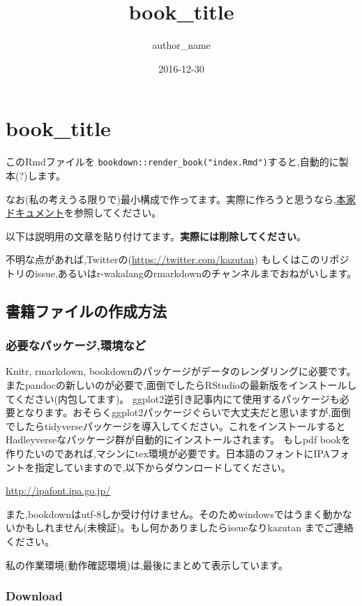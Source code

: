 \documentclass[]{book}
\title{book\_title}
\author{author\_name}
\date{2016-12-30}
\begin{document}
\maketitle

{
\setcounter{tocdepth}{1}
\tableofcontents
}
\chapter{book\_title}\label{book_title}

このRmdファイルを
\texttt{bookdown::render\_book("index.Rmd")}すると,自動的に製本(?)します。

なお(私の考えうる限りで)最小構成で作ってます。実際に作ろうと思うなら,\href{https://bookdown.org/yihui/bookdown/}{本家ドキュメント}を参照してください。

以下は説明用の文章を貼り付けてます。\textbf{実際には削除してください}。

不明な点があれば,Twitterの\citep{kazutan}(\url{https://twitter.com/kazutan})
もしくはこのリポジトリのissue,あるいはr-wakalangのrmarkdownのチャンネルまでおねがいします。

\section{書籍ファイルの作成方法}

\subsection{必要なパッケージ,環境など}

Knitr, rmarkdown,
bookdownのパッケージがデータのレンダリングに必要です。またpandocの新しいのが必要で,面倒でしたらRStudioの最新版をインストールしてください(内包してます)。
ggplot2逆引き記事内にて使用するパッケージも必要となります。おそらくggplot2パッケージぐらいで大丈夫だと思いますが,面倒でしたらtidyverseパッケージを導入してください。これをインストールするとHadleyverseなパッケージ群が自動的にインストールされます。
もしpdf
bookを作りたいのであれば,マシンにtex環境が必要です。日本語のフォントにIPAフォントを指定していますので,以下からダウンロードしてください。

\url{http://ipafont.ipa.go.jp/}

また,bookdownはutf-8しか受け付けません。そのためwindowsではうまく動かないかもしれません(未検証)。もし何かありましたらissueなりkazutan
までご連絡ください。

私の作業環境(動作確認環境)は,最後にまとめて表示しています。

\subsection{Download}\label{download}
\end{document}
